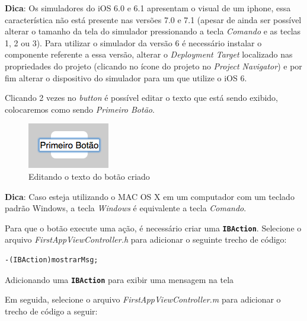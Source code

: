 \documentclass[a4paper,12pt,brazil,doubleside]{book}
\begin{document}
\begin{singlespace}
\begin{framed}

\textbf{Dica}: Os simuladores do iOS 6.0 e 6.1 apresentam o visual de um iphone, essa característica não está presente nas versões 7.0 e 7.1 (apesar de ainda ser possível alterar o tamanho da tela do simulador pressionando a tecla \textit{Comando} e as teclas 1, 2 ou 3). Para utilizar o simulador da versão 6 é necessário instalar o componente referente a essa versão, alterar o \textit{Deployment Target} localizado nas propriedades do projeto (clicando no ícone do projeto no \textit{Project Navigator}) e por fim alterar o dispositivo do simulador para um que utilize o iOS 6.\end{framed}


Clicando 2 vezes no \emph{button} é possível editar o texto que está sendo exibido, colocaremos como sendo \emph{Primeiro Botão}.

\begin{figure}[H]
  \centering
  \includegraphics[scale=0.7]{figuras/3/tela_novo_projeto_20.png}
  \caption{Editando o texto do botão criado}
  \label{fig:a}
\end{figure}

\begin{framed}

\textbf{Dica}: Caso esteja utilizando o MAC OS X em um computador com um teclado padrão Windows, a tecla \textit{Windows }é equivalente a tecla \textit{Comando}.
\end{framed}

Para que o botão execute uma ação, é necessário criar uma \texttt{\textbf{IBAction}}. Selecione o arquivo \emph{FirstAppViewController.h} para adicionar o seguinte trecho de código:

\begin{listing}
\begin{verbatim}
-(IBAction)mostrarMsg;
\end{verbatim}
\caption{Adicionando uma \texttt{\textbf{IBAction}} para exibir uma mensagem na tela}
\end{listing}

Em seguida, selecione o arquivo \emph{FirstAppViewController.m} para adicionar o  trecho de código a seguir:


\end{singlespace}
\end{document}
